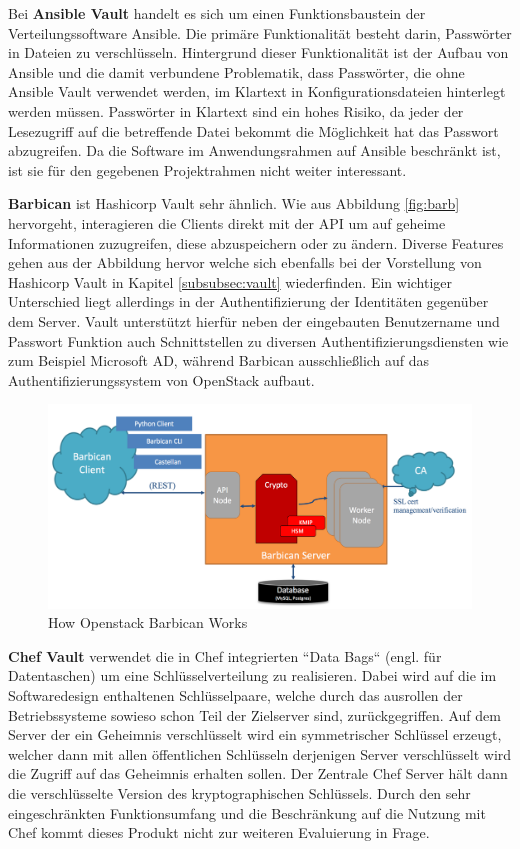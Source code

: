 \documentclass[
book,
a4paper,   
titlepage,  
halfparskip,
12pt        
]{scrartcl}
\begin{document}
\begin{onehalfspacing}
Bei \textbf{Ansible Vault} handelt es sich um einen Funktionsbaustein der Verteilungssoftware Ansible. Die primäre Funktionalität besteht darin, Passwörter in Dateien zu verschlüsseln. Hintergrund dieser Funktionalität ist der Aufbau von Ansible und die damit verbundene Problematik, dass Passwörter, die ohne Ansible Vault verwendet werden, im Klartext in Konfigurationsdateien hinterlegt werden müssen. Passwörter in Klartext sind ein hohes Risiko, da jeder der Lesezugriff auf die betreffende Datei bekommt die Möglichkeit hat das Passwort abzugreifen.\cite{ansible} Da die Software im Anwendungsrahmen auf Ansible beschränkt ist, ist sie für den gegebenen Projektrahmen nicht weiter interessant.

\textbf{Barbican} ist Hashicorp Vault sehr ähnlich. Wie aus Abbildung \vref{fig:barb} hervorgeht, interagieren die Clients direkt mit der \ac{API} um auf geheime Informationen zuzugreifen, diese abzuspeichern oder zu ändern. Diverse Features gehen aus der Abbildung hervor welche sich ebenfalls bei der Vorstellung von Hashicorp Vault in Kapitel \vref{subsubsec:vault} wiederfinden. Ein wichtiger Unterschied liegt allerdings in der Authentifizierung der Identitäten gegenüber dem Server. Vault unterstützt hierfür neben der eingebauten Benutzername und Passwort Funktion auch Schnittstellen zu diversen Authentifizierungsdiensten wie zum Beispiel Microsoft \ac{AD}, während Barbican ausschließlich auf das Authentifizierungssystem von OpenStack aufbaut.\cite[S. 4f]{barbican}
\begin{figure}[h]
	\centering
	\includegraphics[width=1\linewidth]{barbican}
	\caption[Barbican]{How Openstack Barbican Works \cite[S. 4]{barbican}}
	\label{fig:barb}
\end{figure}

\textbf{Chef Vault} verwendet die in Chef integrierten ``Data Bags`` (engl. für Datentaschen) um eine Schlüsselverteilung zu realisieren. Dabei wird auf die im Softwaredesign enthaltenen Schlüsselpaare, welche durch das ausrollen der Betriebssysteme sowieso schon Teil der Zielserver sind, zurückgegriffen. Auf dem Server der ein Geheimnis verschlüsselt wird ein symmetrischer Schlüssel erzeugt, welcher dann mit allen öffentlichen Schlüsseln derjenigen Server verschlüsselt wird die Zugriff auf das Geheimnis erhalten sollen. Der Zentrale Chef Server hält dann die verschlüsselte Version des kryptographischen Schlüssels.\cite{chef} Durch den sehr eingeschränkten Funktionsumfang und die Beschränkung auf die Nutzung mit Chef kommt dieses Produkt nicht zur weiteren Evaluierung in Frage.


\end{onehalfspacing}
\end{document}
